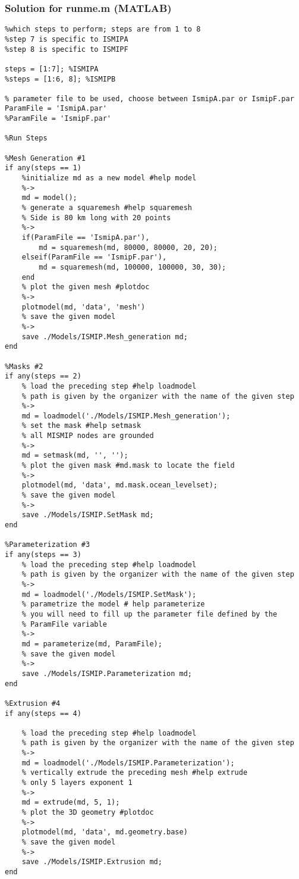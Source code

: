 \subsubsection{Solution for runme.m (MATLAB)}%
\begin{lstlisting}
%which steps to perform; steps are from 1 to 8
%step 7 is specific to ISMIPA
%step 8 is specific to ISMIPF

steps = [1:7]; %ISMIPA
%steps = [1:6, 8]; %ISMIPB

% parameter file to be used, choose between IsmipA.par or IsmipF.par
ParamFile = 'IsmipA.par'
%ParamFile = 'IsmipF.par'

%Run Steps

%Mesh Generation #1
if any(steps == 1)
	%initialize md as a new model #help model
	%->
	md = model();
	% generate a squaremesh #help squaremesh
	% Side is 80 km long with 20 points
	%->
	if(ParamFile == 'IsmipA.par'),
		md = squaremesh(md, 80000, 80000, 20, 20);
	elseif(ParamFile == 'IsmipF.par'),
		md = squaremesh(md, 100000, 100000, 30, 30);
	end
	% plot the given mesh #plotdoc
	%->
	plotmodel(md, 'data', 'mesh')
	% save the given model
	%->
	save ./Models/ISMIP.Mesh_generation md;
end

%Masks #2
if any(steps == 2)
	% load the preceding step #help loadmodel
	% path is given by the organizer with the name of the given step
	%->
	md = loadmodel('./Models/ISMIP.Mesh_generation');
	% set the mask #help setmask
	% all MISMIP nodes are grounded
	%->
	md = setmask(md, '', '');
	% plot the given mask #md.mask to locate the field
	%->
	plotmodel(md, 'data', md.mask.ocean_levelset);
	% save the given model
	%->
	save ./Models/ISMIP.SetMask md;
end

%Parameterization #3
if any(steps == 3)
	% load the preceding step #help loadmodel
	% path is given by the organizer with the name of the given step
	%->
	md = loadmodel('./Models/ISMIP.SetMask');
	% parametrize the model # help parameterize
	% you will need to fill up the parameter file defined by the
	% ParamFile variable
	%->
	md = parameterize(md, ParamFile);
	% save the given model
	%->
	save ./Models/ISMIP.Parameterization md;
end

%Extrusion #4
if any(steps == 4)
	
	% load the preceding step #help loadmodel
	% path is given by the organizer with the name of the given step
	%->
	md = loadmodel('./Models/ISMIP.Parameterization');
	% vertically extrude the preceding mesh #help extrude
	% only 5 layers exponent 1
	%->
	md = extrude(md, 5, 1);
	% plot the 3D geometry #plotdoc
	%->
	plotmodel(md, 'data', md.geometry.base)
	% save the given model
	%->
	save ./Models/ISMIP.Extrusion md;
end


\end{lstlisting}
